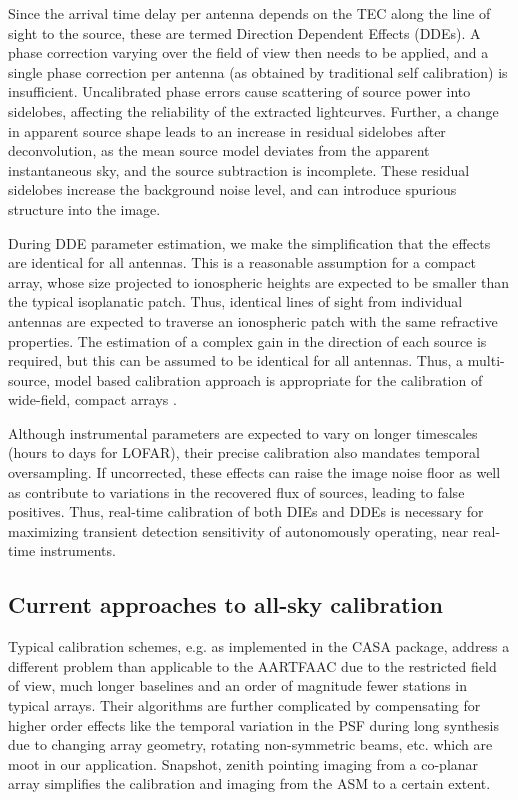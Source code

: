 \documentclass{aa}
\begin{document}
Since the arrival  time delay per antenna  depends on the TEC along  the line of
sight  to the source,  these are  termed Direction  Dependent Effects  (DDEs). A
phase correction varying over the field of  view then needs to be applied, and a
single  phase   correction  per  antenna   (as  obtained  by   traditional  self
calibration)  is insufficient.   Uncalibrated phase  errors cause  scattering of
source  power  into  sidelobes,  affecting  the  reliability  of  the  extracted
lightcurves.  Further, a change in apparent source shape leads to an increase in
residual sidelobes after  deconvolution, as the mean source  model deviates from
the apparent instantaneous sky, and  the source subtraction is incomplete. These
residual  sidelobes  increase the  background  noise  level,  and can  introduce
spurious structure into the image.


During DDE parameter estimation, we make the simplification that the effects are
identical  for all  antennas.  This  is a  reasonable assumption  for  a compact
array, whose  size projected to ionospheric  heights are expected  to be smaller
than  the  typical  isoplanatic  patch.  Thus, identical  lines  of  sight  from
individual antennas are expected to  traverse an ionospheric patch with the same
refractive properties. The estimation of a complex gain in the direction of each
source  is  required,  but  this  can   be  assumed  to  be  identical  for  all
antennas. Thus, a multi-source,  model based calibration approach is appropriate
for      the      calibration       of      wide-field,      compact      arrays
\citep{wijnholds2010calibration}.

Although  instrumental parameters  are  expected to  vary  on longer  timescales
(hours  to days  for LOFAR),  their precise  calibration also  mandates temporal
oversampling.  If uncorrected, these effects  can raise the image noise floor as
well as  contribute to variations in  the recovered flux of  sources, leading to
false positives.  Thus, real-time calibration of both DIEs and DDEs is necessary
for maximizing  transient detection sensitivity of  autonomously operating, near
real-time instruments.

\subsection{Current approaches to all-sky calibration}

Typical calibration schemes, e.g. as  implemented in the CASA package, address a
different problem than applicable to the AARTFAAC due to the restricted field of
view, much longer  baselines and an order of magnitude  fewer stations
in typical arrays. Their algorithms  are further complicated by compensating for
higher  order  effects  like the  temporal  variation  in  the PSF  during  long
synthesis  due  to  changing   array  geometry,  rotating  non-symmetric  beams,
etc. which are moot in our application. Snapshot, zenith pointing imaging from a
co-planar array simplifies the calibration and imaging from the ASM to a certain
extent.
\end{document}
